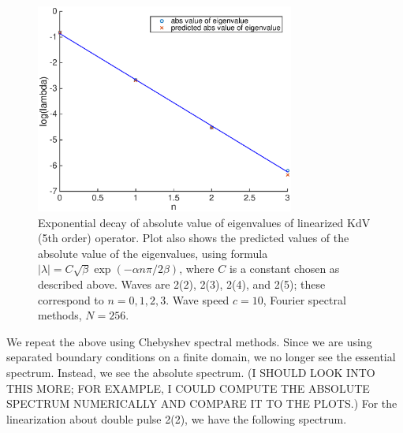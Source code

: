 \documentclass[12pt]{article}
\begin{document}
\begin{figure}[H]
	\includegraphics[width=8.5cm]{decayeigenvalue}
	\caption{Exponential decay of absolute value of eigenvalues of linearized KdV (5th order) operator. Plot also shows the predicted values of the absolute value of the eigenvalues, using formula $|\lambda| = C \sqrt{\beta}\exp{(-\alpha n \pi / 2 \beta)}$, where $C$ is a constant chosen as described above. Waves are 2(2), 2(3), 2(4), and 2(5); these correspond to $n = 0, 1, 2, 3$. Wave speed $c = 10$, Fourier spectral methods, $N = 256$.}
\end{figure}

We repeat the above using Chebyshev spectral methods. Since we are using separated boundary conditions on a finite domain, we no longer see the essential spectrum. Instead, we see the absolute spectrum. (I SHOULD LOOK INTO THIS MORE; FOR EXAMPLE, I COULD COMPUTE THE ABSOLUTE SPECTRUM NUMERICALLY AND COMPARE IT TO THE PLOTS.) For the linearization about double pulse 2(2), we have the following spectrum.
\end{document}
